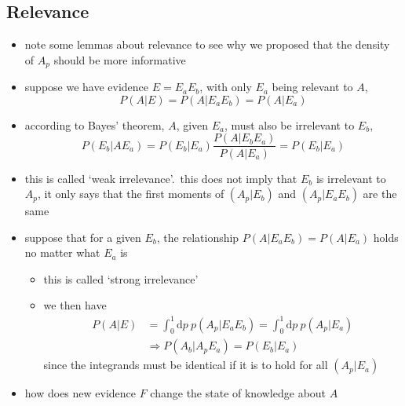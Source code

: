 \documentclass[../jaynes_prob_theory_notes.tex]{subfiles}
\begin{document}
        \subsection{Relevance}
            \begin{itemize} 
                \item note some lemmas about relevance to see why we proposed that the density of \(A_p\) should be more informative
                \item suppose we have evidence \(E = E_a E_b\), with only \(E_a\) being relevant to \(A\),
                    \begin{equation*} 
                        P(A|E) = P(A|E_a E_b) = P(A|E_a)
                    \end{equation*}
                \item according to Bayes' theorem, \(A\), given \(E_a\), must also be irrelevant to \(E_b\),
                    \begin{equation*} 
                        P(E_b|AE_a) = P(E_b|E_a) \frac{P(A|E_b E_a)}{P(A|E_a)} = P(E_b | E_a)
                    \end{equation*}
                \item this is called `weak irrelevance'.\ this does not imply that \(E_b\) is irrelevant to \(A_p\), it only says that the first moments of \((A_p | E_b)\) and \((A_p | E_a E_b)\) are the same
                \item suppose that for a given \(E_b\), the relationship \(P(A|E_a E_b) = P(A|E_a)\) holds no matter what \(E_a\) is
                    \begin{itemize} 
                        \item this is called `strong irrelevance'
                        \item we then have
                            \begin{align*} 
                                P(A|E) &= \int^{1}_{0}\text{d}p~p(A_p|E_a E_b) = \int^{1}_{0}\text{d}p~p(A_p|E_a) \\
                                       &\Rightarrow P(A_b|A_p E_a) = P(E_b | E_a)
                            \end{align*}
                            since the integrands must be identical if it is to hold for all \((A_p | E_a)\)
                    \end{itemize}
                \item how does new evidence \(F\) change the state of knowledge about \(A\)
                    \begin{itemize} 

\end{itemize}
\end{itemize}
\end{document}
